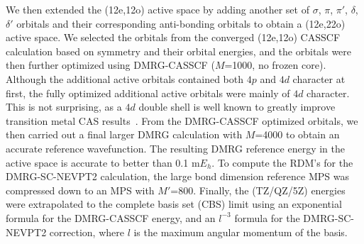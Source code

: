 We then extended the (12e,12o) active space by adding another set of $\sigma$, $\pi$, $\pi'$, $\delta$, $\delta'$ orbitals and their corresponding anti-bonding orbitals 
to obtain a (12e,22o) active space. We selected the orbitals from the converged (12e,12o) CASSCF calculation based on symmetry and their orbital energies,
and the orbitals were then further optimized using DMRG-CASSCF ($M$=1000, no frozen core). Although the additional active orbitals contained both $4p$ and $4d$ character at first, 
the fully optimized additional active orbitals were mainly of $4d$ character.  This is not surprising, as a $4d$ double shell is well known to greatly improve transition metal CAS results~\cite{andersson_excitation_1992}.
From the DMRG-CASSCF optimized orbitals, we then carried out a final larger DMRG calculation with $M$=4000 to obtain an accurate reference wavefunction.
The resulting DMRG reference energy in the active space is accurate to better than 0.1 m$E_h$.
To compute the RDM's for the DMRG-SC-NEVPT2 calculation, the large bond dimension reference MPS was compressed down to an MPS with $M'$=800. 
Finally, the (TZ/QZ/5Z) energies were extrapolated to the complete basis set (CBS) limit using
an exponential formula for the DMRG-CASSCF energy, and an $l^{-3}$ formula for the DMRG-SC-NEVPT2 correction, where $l$ is the maximum angular momentum
of the basis.

